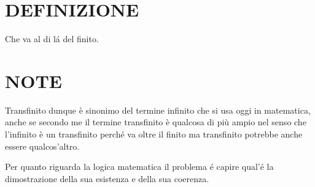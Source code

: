 
\section{DEFINIZIONE}
Che va al di l\'{a} del finito.

\section{NOTE}
Transfinito dunque è sinonimo del termine infinito che si usa oggi in matematica, anche se secondo me il termine transfinito è qualcosa di più ampio
nel senso che l'infinito è un transfinito perch\'{e} va oltre il finito ma transfinito potrebbe anche essere qualcos'altro.

Per quanto riguarda la logica matematica il problema \'{e} capire qual'\'{e} la dimostrazione della sua esistenza e della sua coerenza.

